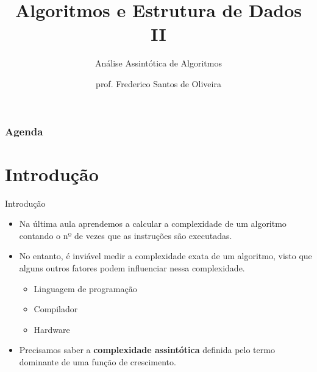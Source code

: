 \documentclass[aspectratio=169]{beamer}
\title[Análise Assintótica de Algoritmos]{Algoritmos e Estrutura de Dados II}
\subtitle{Análise Assintótica de Algoritmos}
\author[Frederico Santos de Oliveira]{prof. Frederico Santos de Oliveira}
\institute[UFMT]{Universidade Federal de Mato Grosso\\ Instituto de Engenharia}
\date{}
\begin{document}
\begin{frame}[plain]
  \titlepage
\end{frame}


\begin{frame}
  \frametitle{Agenda}
  \tableofcontents
\end{frame}

\section{Introdução}

\begin{frame}{Introdução}
\begin{itemize}
 \item Na última aula aprendemos a calcular a complexidade de um algoritmo contando o nº de vezes que as instruções são executadas.
 \item No entanto, é inviável medir a complexidade exata de um algoritmo, visto que alguns outros fatores podem influenciar nessa complexidade.
 \begin{itemize}
 \item Linguagem de programação
 \item Compilador
 \item Hardware
 \end{itemize}
 \item Precisamos saber a {\bf complexidade assintótica} definida pelo termo dominante de uma função de crescimento.
\end{itemize}
\end{frame}

\end{document}
